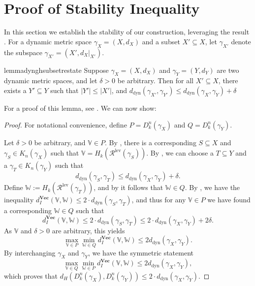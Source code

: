 \documentclass[a4paper,UKenglish,thm-restate]{article}
\theoremstyle{definition}
\def\bbv{\mathbb{V}}
\def\bbw{\mathbb{W}}
\def\bvec{\mathbf{Vec}}
\begin{document}
\section{Proof of Stability Inequality} \label{sec:stabilityproof}
    In this section we establish the stability of our construction, leveraging the result \cite[Theorem 4.1]{spatiotemporal}. For a dynamic metric space $\gamma_X = (X, d_X)$ and a subset $X' \subseteq X$, let $\gamma_{X'}$ denote the subspace $\gamma_{X'} = (X', d_X |_{X'})$.
    \begin{restatable}[]{lemma}{dynghsubsetrestate} \label{lem:dynghsubset}
        Suppose $\gamma_X = (X, d_X)$ and $\gamma_Y = (Y, d_Y)$ are two dynamic metric spaces, and let $\delta > 0$ be arbitrary. Then for all $X' \subseteq X$, there exists a $Y' \subseteq Y$ such that $|Y'| \leq |X'|$, and $d_{\text{dyn}}(\gamma_{X'}, \gamma_{Y'}) \leq d_{\text{dyn}}(\gamma_X, \gamma_Y) + \delta$
    \end{restatable}
    For a proof of this lemma, see . We can now show:
    \stabrestate*
    \begin{proof}
        For notational convenience, define $P = D_k^n(\gamma_X)$ and $Q = D_k^n(\gamma_Y)$.
        
        Let $\delta > 0$ be arbitrary, and $\bbv \in P$. By , there is a corresponding $S \subseteq X$ and $\gamma_S \in K_n(\gamma_X)$ such that $\bbv = H_k(\mathcal{R}^{\text{lev}}(\gamma_S))$. By , we can choose a $T \subseteq Y$ and a $\gamma_T \in K_n(\gamma_Y)$ such that
        \[d_{\text{dyn}}(\gamma_S, \gamma_T) \leq d_{\text{dyn}}(\gamma_X, \gamma_Y) + \delta.\]
        Define $\bbw := H_k(\mathcal{R}^{\text{lev}}(\gamma_T))$, and by  it follows that $\bbw \in Q$. By \cite[Theorem 4.1]{spatiotemporal}, we have the inequality $d_I^{\bvec}(\bbv, \bbw) \leq 2 \cdot d_{\text{dyn}}(\gamma_S, \gamma_T)$,
        and thus for any $\bbv \in P$ we have found a corresponding $\bbw \in Q$ such that
        \[d_I^{\bvec}(\bbv, \bbw) \leq 2 \cdot d_{\text{dyn}}(\gamma_S, \gamma_T) \leq 2 \cdot d_{\text{dyn}}(\gamma_X, \gamma_Y) + 2 \delta.\]
        As $\bbv$ and $\delta > 0$ are arbitrary, this yields 
        \[\max_{\bbv \in P} \min_{\bbw \in Q} d_I^{\bvec}(\bbv, \bbw) \leq 2 d_{\text{dyn}}(\gamma_X, \gamma_Y).\]
        By interchanging $\gamma_X$ and $\gamma_Y$, we have the symmetric statement
        \[\max_{\bbv \in Q} \min_{\bbw \in P} d_I^{\bvec}(\bbv, \bbw) \leq 2 d_{\text{dyn}}(\gamma_X, \gamma_Y),\]
        which proves that $d_H\left(D_k^n(\gamma_X), D_k^n(\gamma_Y)\right) \leq 2 \cdot d_{\text{dyn}}(\gamma_X, \gamma_Y)$.
    \end{proof}
\end{document}
